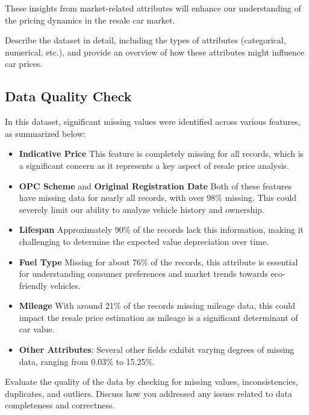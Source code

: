 \documentclass[conference]{IEEEtran}
\begin{document}
These insights from market-related attributes will enhance our understanding of the pricing dynamics in the resale car market.

{\small Describe the dataset in detail, including the types of attributes (categorical, numerical, etc.), and provide an overview of how these attributes might influence car prices.}

\subsection{Data Quality Check}
\label{subsec:data_quality}
In this dataset, significant missing values were identified across various features, as summarized below:

\begin{itemize}
    \item \textbf{Indicative Price} This feature is completely missing for all records, which is a significant concern as it represents a key aspect of resale price analysis.
    
    \item \textbf{OPC Scheme} and \textbf{Original Registration Date} Both of these features have missing data for nearly all records, with over 98\% missing. This could severely limit our ability to analyze vehicle history and ownership.
    
    \item \textbf{Lifespan} Approximately 90\% of the records lack this information, making it challenging to determine the expected value depreciation over time.
    
    \item \textbf{Fuel Type} Missing for about 76\% of the records, this attribute is essential for understanding consumer preferences and market trends towards eco-friendly vehicles.
    
    \item \textbf{Mileage} With around 21\% of the records missing mileage data, this could impact the resale price estimation as mileage is a significant determinant of car value.
    
    \item \textbf{Other Attributes}: Several other fields exhibit varying degrees of missing data, ranging from 0.03\% to 15.25\%. 
\end{itemize}

{\small Evaluate the quality of the data by checking for missing values, inconsistencies, duplicates, and outliers. Discuss how you addressed any issues related to data completeness and correctness.}
\end{document}
